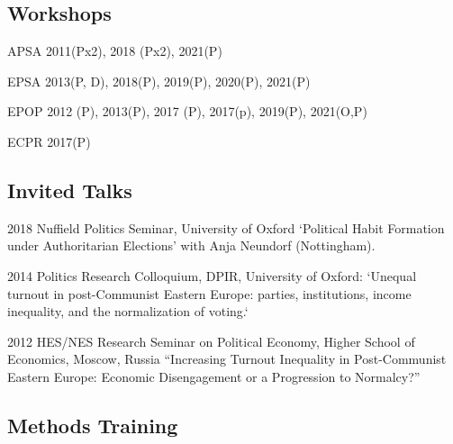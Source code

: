 \documentclass[12pt,letterpaper]{report}
\begin{document}
\subsection*{Workshops}



\begin{tablist}
	
	\item[APSA]   \tab{}2011(Px2), 2018 (Px2), 2021(P)
	
	
	\item[EPSA] \tab{}2013(P, D), 2018(P), 2019(P), 2020(P), 2021(P)
	
	
	\item[EPOP] \tab{}2012 (P), 2013(P), 2017 (P), 2017(p), 2019(P), 2021(O,P)
	
	\item[ECPR] \tab{}2017(P)
	
	
\end{tablist}

\subsection*{Invited Talks}



\begin{tablist}
	
	\item[2018]   \tab{}Nuffield Politics Seminar, University of Oxford `Political Habit Formation under Authoritarian Elections’ with Anja Neundorf (Nottingham).
	
	
	
	
	\item[2014] \tab{}Politics Research Colloquium, DPIR, University of Oxford: `Unequal turnout in post-Communist Eastern Europe: parties, institutions, income inequality, and the normalization of voting.`
	
	
	\item[2012] \tab{}HES/NES Research Seminar on Political Economy, Higher School of Economics, Moscow, Russia “Increasing Turnout Inequality in Post-Communist Eastern Europe: Economic Disengagement or a Progression to Normalcy?”
	
	
	
\end{tablist}

\subsection*{Methods Training}
\end{document}
